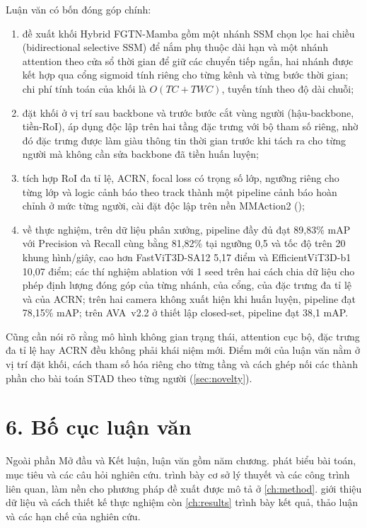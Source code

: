 Luận văn có bốn đóng góp chính:
\begin{enumerate}[label=(\arabic*)]
  \item đề xuất khối Hybrid FGTN-Mamba gồm một nhánh SSM chọn lọc hai chiều (bidirectional selective SSM) để nắm phụ thuộc dài hạn và một nhánh attention theo cửa sổ thời gian để giữ các chuyển tiếp ngắn, hai nhánh được kết hợp qua cổng sigmoid tính riêng cho từng kênh và từng bước thời gian; chi phí tính toán của khối là $O(TC + TWC)$, tuyến tính theo độ dài chuỗi;
  \item đặt khối ở vị trí sau backbone và trước bước cắt vùng người (hậu-backbone, tiền-RoI), áp dụng độc lập trên hai tầng đặc trưng với bộ tham số riêng, nhờ đó đặc trưng được làm giàu thông tin thời gian trước khi tách ra cho từng người mà không cần sửa backbone đã tiền huấn luyện;
  \item tích hợp RoI đa tỉ lệ, ACRN, focal loss có trọng số lớp, ngưỡng riêng cho từng lớp và logic cảnh báo theo track thành một pipeline cảnh báo hoàn chỉnh ở mức từng người, cài đặt độc lập trên nền MMAction2 ();
  \item về thực nghiệm, trên dữ liệu phân xưởng, pipeline đầy đủ đạt 89,83\% mAP với Precision và Recall cùng bằng 81,82\% tại ngưỡng 0,5 và tốc độ trên 20 khung hình/giây, cao hơn FastViT3D-SA12 5,17 điểm và EfficientViT3D-b1 10,07 điểm; các thí nghiệm ablation với 1 seed trên hai cách chia dữ liệu cho phép định lượng đóng góp của từng nhánh, của cổng, của đặc trưng đa tỉ lệ và của ACRN; trên hai camera không xuất hiện khi huấn luyện, pipeline đạt 78,15\% mAP; trên AVA~v2.2 ở thiết lập closed-set, pipeline đạt 38,1 mAP.
\end{enumerate}
Cũng cần nói rõ rằng mô hình không gian trạng thái, attention cục bộ, đặc trưng đa tỉ lệ hay ACRN đều không phải khái niệm mới. Điểm mới của luận văn nằm ở vị trí đặt khối, cách tham số hóa riêng cho từng tầng và cách ghép nối các thành phần cho bài toán STAD theo từng người (\cref{sec:novelty}).

\section*{6. Bố cục luận văn}

Ngoài phần Mở đầu và Kết luận, luận văn gồm năm chương.  phát biểu bài toán, mục tiêu và các câu hỏi nghiên cứu.  trình bày cơ sở lý thuyết và các công trình liên quan, làm nền cho phương pháp đề xuất được mô tả ở \cref{ch:method}.  giới thiệu dữ liệu và cách thiết kế thực nghiệm còn \cref{ch:results} trình bày kết quả, thảo luận và các hạn chế của nghiên cứu.
\clearpage
